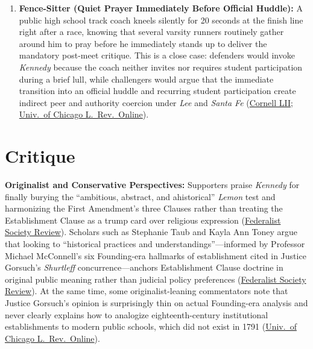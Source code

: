 \documentclass[12pt]{article}
\begin{document}
\begin{enumerate}
    \item \textbf{Fence-Sitter (Quiet Prayer Immediately Before Official Huddle):} A public high school track coach kneels silently for 20 seconds at the finish line right after a race, knowing that several varsity runners routinely gather around him to pray before he immediately stands up to deliver the mandatory post-meet critique. This is a close case: defenders would invoke \textit{Kennedy} because the coach neither invites nor requires student participation during a brief lull, while challengers would argue that the immediate transition into an official huddle and recurring student participation create indirect peer and authority coercion under \textit{Lee} and \textit{Santa Fe} (\href{https://www.law.cornell.edu/supremecourt/text/21-418}{Cornell LII}; \href{https://lawreview.uchicago.edu/online-archive/establishment-originalism-kennedy-v-bremerton-school-district}{Univ.\ of Chicago L.\ Rev.\ Online}).
\end{enumerate}

\section{Critique}
\textbf{Originalist and Conservative Perspectives:} Supporters praise \textit{Kennedy} for finally burying the ``ambitious, abstract, and ahistorical'' \textit{Lemon} test and harmonizing the First Amendment's three Clauses rather than treating the Establishment Clause as a trump card over religious expression (\href{https://fedsoc.org/fedsoc-review/a-cord-of-three-strands-how-kennedy-v-bremerton-school-district-changed-free-exercise-establishment-and-free-speech-clause-doctrine}{Federalist Society Review}). Scholars such as Stephanie Taub and Kayla Ann Toney argue that looking to ``historical practices and understandings''---informed by Professor Michael McConnell's six Founding-era hallmarks of establishment cited in Justice Gorsuch's \textit{Shurtleff} concurrence---anchors Establishment Clause doctrine in original public meaning rather than judicial policy preferences (\href{https://fedsoc.org/fedsoc-review/a-cord-of-three-strands-how-kennedy-v-bremerton-school-district-changed-free-exercise-establishment-and-free-speech-clause-doctrine}{Federalist Society Review}). At the same time, some originalist-leaning commentators note that Justice Gorsuch's opinion is surprisingly thin on actual Founding-era analysis and never clearly explains how to analogize eighteenth-century institutional establishments to modern public schools, which did not exist in 1791 (\href{https://lawreview.uchicago.edu/online-archive/establishment-originalism-kennedy-v-bremerton-school-district}{Univ.\ of Chicago L.\ Rev.\ Online}).
\end{document}
